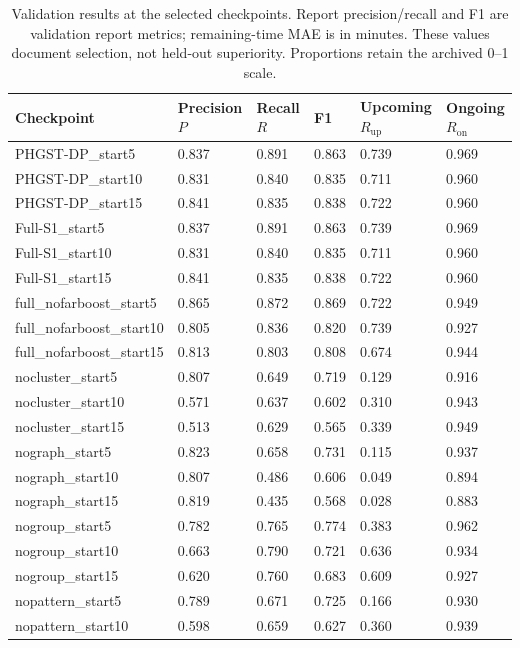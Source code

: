 \begin{table}[p]
\centering\scriptsize
\caption{Validation results at the selected checkpoints. Report precision/recall and F1 are validation report metrics; remaining-time MAE is in minutes. These values document selection, not held-out superiority. Proportions retain the archived 0--1 scale.}
\begin{tabularx}{\textwidth}{lXXXXX}
\toprule
Checkpoint & Precision $P$ & Recall $R$ & F1 & Upcoming $R_{\mathrm{up}}$ & Ongoing $R_{\mathrm{on}}$ \\
\midrule
PHGST-DP\_start5 & 0.837 & 0.891 & 0.863 & 0.739 & 0.969 \\
PHGST-DP\_start10 & 0.831 & 0.840 & 0.835 & 0.711 & 0.960 \\
PHGST-DP\_start15 & 0.841 & 0.835 & 0.838 & 0.722 & 0.960 \\
Full-S1\_start5 & 0.837 & 0.891 & 0.863 & 0.739 & 0.969 \\
Full-S1\_start10 & 0.831 & 0.840 & 0.835 & 0.711 & 0.960 \\
Full-S1\_start15 & 0.841 & 0.835 & 0.838 & 0.722 & 0.960 \\
full\_nofarboost\_start5 & 0.865 & 0.872 & 0.869 & 0.722 & 0.949 \\
full\_nofarboost\_start10 & 0.805 & 0.836 & 0.820 & 0.739 & 0.927 \\
full\_nofarboost\_start15 & 0.813 & 0.803 & 0.808 & 0.674 & 0.944 \\
nocluster\_start5 & 0.807 & 0.649 & 0.719 & 0.129 & 0.916 \\
nocluster\_start10 & 0.571 & 0.637 & 0.602 & 0.310 & 0.943 \\
nocluster\_start15 & 0.513 & 0.629 & 0.565 & 0.339 & 0.949 \\
nograph\_start5 & 0.823 & 0.658 & 0.731 & 0.115 & 0.937 \\
nograph\_start10 & 0.807 & 0.486 & 0.606 & 0.049 & 0.894 \\
nograph\_start15 & 0.819 & 0.435 & 0.568 & 0.028 & 0.883 \\
nogroup\_start5 & 0.782 & 0.765 & 0.774 & 0.383 & 0.962 \\
nogroup\_start10 & 0.663 & 0.790 & 0.721 & 0.636 & 0.934 \\
nogroup\_start15 & 0.620 & 0.760 & 0.683 & 0.609 & 0.927 \\
nopattern\_start5 & 0.789 & 0.671 & 0.725 & 0.166 & 0.930 \\
nopattern\_start10 & 0.598 & 0.659 & 0.627 & 0.360 & 0.939 \\

\end{tabularx}
\end{table}
